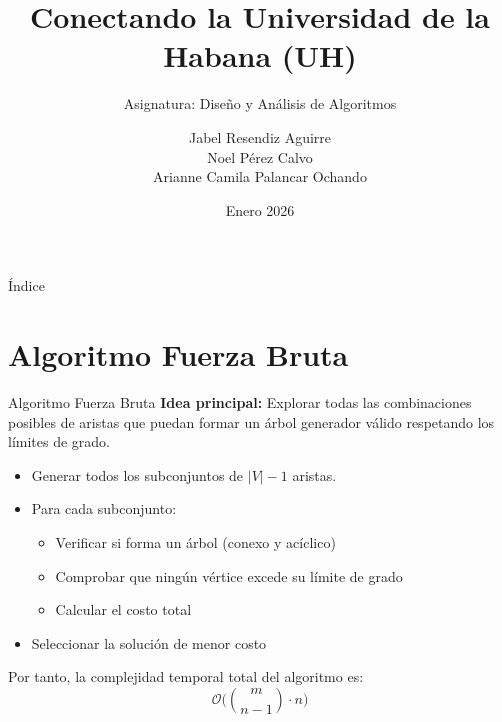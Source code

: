 \documentclass{beamer}
\title{Conectando la Universidad de la Habana (UH)}
\subtitle{Asignatura: Diseño y Análisis de Algoritmos}
\author{Jabel Resendiz Aguirre \\ Noel Pérez Calvo \\ Arianne Camila Palancar Ochando}
\date{Enero 2026}
\begin{document}
\begin{frame}
  \titlepage
\end{frame}

\begin{frame}{Índice}
  \tableofcontents
\end{frame}

\section{Algoritmo Fuerza Bruta}
\begin{frame}{Algoritmo Fuerza Bruta}
	\textbf{Idea principal:} Explorar todas las combinaciones posibles de aristas que puedan formar un árbol generador válido respetando los límites de grado.
	\vspace{0.3cm}
\begin{itemize}
  \item Generar todos los subconjuntos de $|V|-1$ aristas.
  \item Para cada subconjunto:
    \begin{itemize}
      \item Verificar si forma un árbol (conexo y acíclico)
      \item Comprobar que ningún vértice excede su límite de grado
      \item Calcular el costo total
    \end{itemize}
  \item Seleccionar la solución de menor costo
\end{itemize}

Por tanto, la complejidad temporal total del algoritmo es:
\[
\mathcal{O}\Bigg(\binom{m}{n-1} \cdot n\Bigg)
\]

\end{frame}

\end{document}
